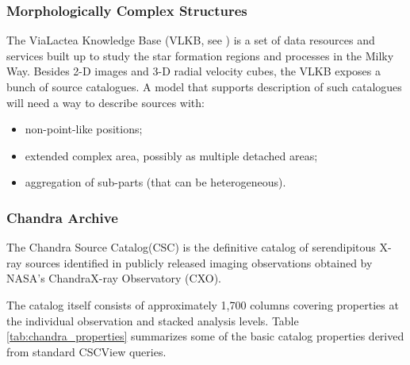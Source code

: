 \documentclass[11pt,a4paper]{ivoa}
\begin{document}
 
\subsubsection{Morphologically Complex Structures}
The ViaLactea Knowledge Base (VLKB, see \cite{2016SPIE.9913E..0HM}) is a set of data
resources and services built up to study the star formation regions and
processes in the Milky Way. Besides 2-D images and 3-D radial velocity
cubes, the VLKB exposes a bunch of source catalogues.
A model that supports description of such catalogues will need a
way to describe sources with:
\begin{itemize}[noitemsep,topsep=0pt,parsep=0pt,partopsep=0pt]
	\item non-point-like positions;
	\item extended complex area, possibly as multiple detached areas;
	\item aggregation of sub-parts (that can be heterogeneous).
\end{itemize}

\subsubsection{Chandra Archive}
The Chandra Source Catalog(CSC) is the definitive catalog of serendipitous X-ray sources identified in
publicly released imaging observations obtained by NASA’s ChandraX-ray Observatory (CXO).

The catalog itself consists of approximately 1,700 columns covering properties at the 
individual observation and stacked analysis levels.
Table \ref{tab:chandra_properties} summarizes some of the basic catalog properties derived
from standard CSCView queries. 
\end{document}

